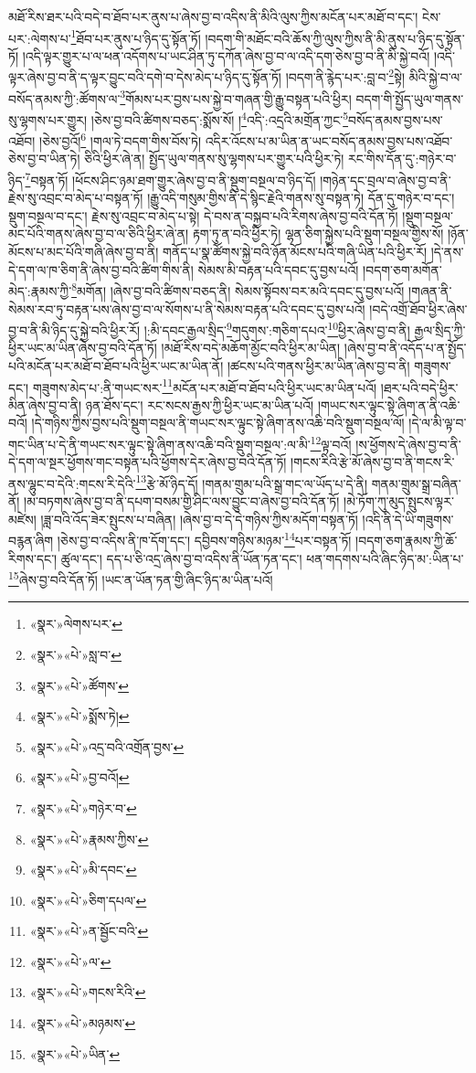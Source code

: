 མཐོ་རིས་ཐར་པའི་བདེ་བ་ཐོབ་པར་ནུས་པ་ཞེས་བྱ་བ་འདིས་ནི་མིའི་ལུས་ཀྱིས་མངོན་པར་མཐོ་བ་དང་། ངེས་པར་:ལེགས་པ་\footnote{«སྣར་»ལེགས་པར་}ཐོབ་པར་ནུས་པ་ཉིད་དུ་སྟོན་ཏོ། །བདག་གི་མཐོང་བའི་ཆོས་ཀྱི་ལུས་ཀྱིས་ནི་མི་ནུས་པ་ཉིད་དུ་སྟོན་ཏོ། །འདི་ལྟར་གྱུར་པ་ལ་ཕན་འདོགས་པ་ཡང་ཤིན་ཏུ་དཀོན་ཞེས་བྱ་བ་ལ་འདི་དག་ཅེས་བྱ་བ་ནི་མི་སྐྱེ་བའོ། །འདི་ལྟར་ཞེས་བྱ་བ་ནི་ད་ལྟར་བྱུང་བའི་དགེ་བ་དེས་མེད་པ་ཉིད་དུ་སྟོན་ཏོ། །བདག་ནི་རྙེད་པར་:བླ་བ་\footnote{«སྣར་»«པེ་»སླ་བ་}སྟེ། མིའི་སྐྱེ་བ་ལ་བསོད་ནམས་ཀྱི་:ཚོགས་ལ་\footnote{«སྣར་»«པེ་»ཚོགས་}གོམས་པར་བྱས་པས་སྐྱེ་བ་གཞན་གྱི་རྒྱུ་བསྟན་པའི་ཕྱིར། བདག་གི་སྤྱོད་ཡུལ་གནས་སུ་ལྷགས་པར་གྱུར། །ཅེས་བྱ་བའི་ཚིགས་བཅད་:སྨོས་སོ། །\footnote{«སྣར་»«པེ་»སྨོས་ཏེ། }འདི་:འདྲའི་མགྲོན་ཀྱང་\footnote{«སྣར་»«པེ་»འདྲ་བའི་འགྲོན་བྱས་}བསོད་ནམས་བྱས་པས་འཐོབ། །ཅེས་བྱའོ།\footnote{«སྣར་»«པེ་»བྱ་བའོ།} །གལ་ཏེ་བདག་གིས་བོས་ཏེ། འདིར་འོངས་པ་མ་ཡིན་ན་ཡང་བསོད་ནམས་བྱས་པས་འཐོབ་ཅེས་བྱ་བ་ཡིན་ཏེ། ཅིའི་ཕྱིར་ཞེ་ན། སྤྱོད་ཡུལ་གནས་སུ་ལྷགས་པར་གྱུར་པའི་ཕྱིར་ཏེ། རང་གིས་དོན་དུ་:གཉེར་བ་ཉིད་\footnote{«སྣར་»«པེ་»གཉེར་བ་}བསྟན་ཏོ། །ཕོངས་ཤིང་ཉམ་ཐག་གྱུར་ཞེས་བྱ་བ་ནི་སྡུག་བསྔལ་བ་ཉིད་དོ། །གཉེན་དང་བྲལ་བ་ཞེས་བྱ་བ་ནི་རྗེས་སུ་འབྲང་བ་མེད་པ་བསྟན་ཏོ། །རྒྱུ་འདི་གསུམ་གྱིས་ནི་དེ་སྙིང་རྗེའི་གནས་སུ་བསྟན་ཏེ། དོན་དུ་གཉེར་བ་དང་། སྡུག་བསྔལ་བ་དང་། རྗེས་སུ་འབྲང་བ་མེད་པ་སྟེ། དེ་བས་ན་བསྐྱབ་པའི་རིགས་ཞེས་བྱ་བའི་དོན་ཏོ། །སྡུག་བསྔལ་མང་པོའི་གནས་ཞེས་བྱ་བ་ལ་ཅིའི་ཕྱིར་ཞེ་ན། རྟག་ཏུ་ན་བའི་ཕྱིར་ཏེ། ལྷན་ཅིག་སྐྱེས་པའི་སྡུག་བསྔལ་གྱིས་སོ། །ཉོན་མོངས་པ་མང་པོའི་གཞི་ཞེས་བྱ་བ་ནི། གནོད་པ་སྣ་ཚོགས་སྐྱེ་བའི་ཉོན་མོངས་པའི་གཞི་ཡིན་པའི་ཕྱིར་རོ། །དེ་ནས་དེ་དག་ལ་ཁ་ཅིག་ནི་ཞེས་བྱ་བའི་ཚིག་གིས་ནི། སེམས་མི་བརྟན་པའི་དབང་དུ་བྱས་པའོ། །བདག་ཅག་མགོན་མེད་:རྣམས་ཀྱི་\footnote{«སྣར་»«པེ་»རྣམས་ཀྱིས་}མགོན། །ཞེས་བྱ་བའི་ཚིགས་བཅད་ནི། སེམས་སྟོབས་བར་མའི་དབང་དུ་བྱས་པའོ། །གཞན་ནི་སེམས་རབ་ཏུ་བརྟན་པས་ཞེས་བྱ་བ་ལ་སོགས་པ་ནི་སེམས་བརྟན་པའི་དབང་དུ་བྱས་པའོ། །བདེ་འགྲོ་ཐོབ་ཕྱིར་ཞེས་བྱ་བ་ནི་མི་ཉིད་དུ་སྐྱེ་བའི་ཕྱིར་རོ། །:མི་དབང་རྒྱལ་སྲིད་\footnote{«སྣར་»«པེ་»མི་དབང་}གདུགས་:གཅིག་དཔའ་\footnote{«སྣར་»«པེ་»ཅིག་དཔལ་}ཕྱིར་ཞེས་བྱ་བ་ནི། རྒྱལ་སྲིད་ཀྱི་ཕྱིར་ཡང་མ་ཡིན་ཞེས་བྱ་བའི་དོན་ཏོ། །མཐོ་རིས་བདེ་མཆོག་མྱོང་བའི་ཕྱིར་མ་ཡིན། །ཞེས་བྱ་བ་ནི་འདོད་པ་ན་སྤྱོད་པའི་མངོན་པར་མཐོ་བ་ཐོབ་པའི་ཕྱིར་ཡང་མ་ཡིན་ནོ། །ཚངས་པའི་གནས་ཕྱིར་མ་ཡིན་ཞེས་བྱ་བ་ནི། གཟུགས་དང་། གཟུགས་མེད་པ་:ནི་གཡང་སར་\footnote{«སྣར་»«པེ་»ན་སྦྱོང་བའི་}མངོན་པར་མཐོ་བ་ཐོབ་པའི་ཕྱིར་ཡང་མ་ཡིན་པའོ། །ཐར་པའི་བདེ་ཕྱིར་མིན་ཞེས་བྱ་བ་ནི། ཉན་ཐོས་དང་། རང་སངས་རྒྱས་ཀྱི་ཕྱིར་ཡང་མ་ཡིན་པའོ། །གཡང་སར་ལྟུང་སྟེ་ཞིག་ན་ནི་འཆི་བའོ། །དེ་གཉིས་ཀྱིས་བྱས་པའི་སྡུག་བསྔལ་ནི་གཡང་སར་ལྟུང་སྟེ་ཞིག་ནས་འཆི་བའི་སྡུག་བསྔལ་ལོ། །དེ་ལ་མི་ལྟ་བ་གང་ཡིན་པ་དེ་ནི་གཡང་སར་ལྟུང་སྟེ་ཞིག་ནས་འཆི་བའི་སྡུག་བསྔལ་:ལ་མི་\footnote{«སྣར་»«པེ་»ལ་}ལྟ་བའོ། །ས་ཕྱོགས་དེ་ཞེས་བྱ་བ་ནི་དེ་དག་ལ་སྔར་ཕྱོགས་གང་བསྟན་པའི་ཕྱོགས་དེར་ཞེས་བྱ་བའི་དོན་ཏོ། །གངས་རིའི་རྩེ་མོ་ཞེས་བྱ་བ་ནི་གངས་རི་ནས་ལྷུང་བ་དེའི་:གངས་རི་དེའི་\footnote{«སྣར་»«པེ་»གངས་རིའི་}རྩེ་མོ་ཉིད་དོ། །གནམ་གྲུམ་པའི་སྒྲ་གང་ལ་ཡོད་པ་དེ་ནི། གནམ་གྲུམ་སྒྲ་བཞིན་ནོ། །མ་བཏགས་ཞེས་བྱ་བ་ནི་དཔག་བསམ་གྱི་ཤིང་ལས་བྱུང་བ་ཞེས་བྱ་བའི་དོན་ཏོ། །མེ་ཏོག་ཀུ་མུད་སྤུངས་ལྟར་མཛེས། །ཟླ་བའི་འོད་ཟེར་སྤུངས་པ་བཞིན། །ཞེས་བྱ་བ་དེ་དེ་གཉིས་ཀྱིས་མདོག་བསྟན་ཏོ། །འདི་ནི་དེ་ཡི་གཟུགས་བརྙན་ཞིག །ཅེས་བྱ་བ་འདིས་ནི་ཁ་དོག་དང་། དབྱིབས་གཉིས་མཉམ་\footnote{«སྣར་»«པེ་»མཉམས་}པར་བསྟན་ཏོ། །བདག་ཅག་རྣམས་ཀྱི་ཆོ་རིགས་དང་། ཚུལ་དང་། དད་པ་ཅི་འདྲ་ཞེས་བྱ་བ་འདིས་ནི་ཡོན་ཏན་དང་། ཕན་གདགས་པའི་ཞིང་ཉིད་མ་:ཡིན་པ་\footnote{«སྣར་»«པེ་»ཡིན་}ཞེས་བྱ་བའི་དོན་ཏོ། །ཡང་ན་ཡོན་ཏན་གྱི་ཞིང་ཉིད་མ་ཡིན་པའོ། 